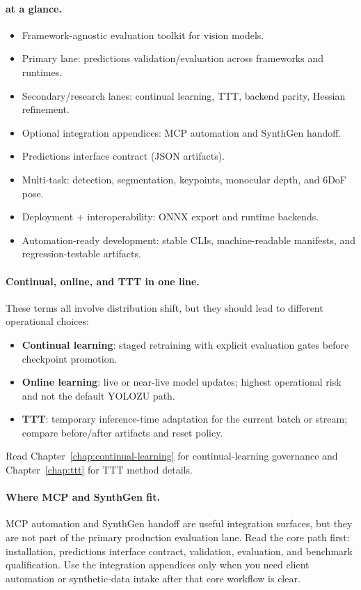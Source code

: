 \paragraph{\yolozu{} at a glance.}
\begin{itemize}
  \item Framework-agnostic evaluation toolkit for vision models.
  \item Primary lane: predictions validation/evaluation across frameworks and runtimes.
  \item Secondary/research lanes: continual learning, TTT, backend parity, Hessian refinement.
  \item Optional integration appendices: MCP automation and SynthGen handoff.
  \item Predictions interface contract (JSON artifacts).
  \item Multi-task: detection, segmentation, keypoints, monocular depth, and 6DoF pose.
  \item Deployment + interoperability: ONNX export and runtime backends.
  \item Automation-ready development: stable CLIs, machine-readable manifests, and regression-testable artifacts.
\end{itemize}

\paragraph{Continual, online, and TTT in one line.}
These terms all involve distribution shift, but they should lead to different
operational choices:
\begin{itemize}
  \item \textbf{Continual learning}: staged retraining with explicit evaluation gates before checkpoint promotion.
  \item \textbf{Online learning}: live or near-live model updates; highest operational risk and not the default YOLOZU path.
  \item \textbf{TTT}: temporary inference-time adaptation for the current batch or stream; compare before/after artifacts and reset policy.
\end{itemize}
Read Chapter~\ref{chap:continual-learning} for continual-learning governance and Chapter~\ref{chap:ttt} for TTT method details.

\paragraph{Where MCP and SynthGen fit.}
MCP automation and SynthGen handoff are useful integration surfaces, but they
are not part of the primary production evaluation lane. Read the core path
first: installation, predictions interface contract, validation, evaluation,
and benchmark qualification. Use the integration appendices only when you need
client automation or synthetic-data intake after that core workflow is clear.


